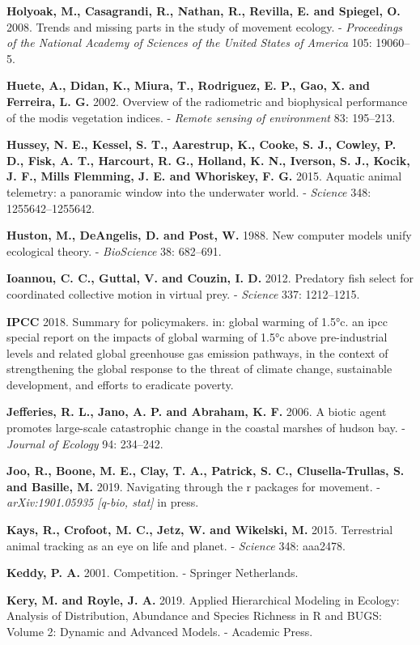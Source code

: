 \documentclass[]{scrartcl}
\begin{document}
\begin{multicols}{2}
\textbf{Holyoak, M., Casagrandi, R., Nathan, R., Revilla, E. and
Spiegel, O.} 2008. Trends and missing parts in the study of movement
ecology. - \emph{Proceedings of the National Academy of Sciences of the
United States of America} 105: 19060--5.

\textbf{Huete, A., Didan, K., Miura, T., Rodriguez, E. P., Gao, X. and
Ferreira, L. G.} 2002. Overview of the radiometric and biophysical
performance of the modis vegetation indices. - \emph{Remote sensing of
environment} 83: 195--213.

\textbf{Hussey, N. E., Kessel, S. T., Aarestrup, K., Cooke, S. J.,
Cowley, P. D., Fisk, A. T., Harcourt, R. G., Holland, K. N., Iverson, S.
J., Kocik, J. F., Mills Flemming, J. E. and Whoriskey, F. G.} 2015.
Aquatic animal telemetry: a panoramic window into the underwater world.
- \emph{Science} 348: 1255642--1255642.

\textbf{Huston, M., DeAngelis, D. and Post, W.} 1988. New computer
models unify ecological theory. - \emph{BioScience} 38: 682--691.

\textbf{Ioannou, C. C., Guttal, V. and Couzin, I. D.} 2012. Predatory
fish select for coordinated collective motion in virtual prey. -
\emph{Science} 337: 1212--1215.

\textbf{IPCC} 2018. Summary for policymakers. in: global warming of
1.5°c. an ipcc special report on the impacts of global warming of 1.5°c
above pre-industrial levels and related global greenhouse gas emission
pathways, in the context of strengthening the global response to the
threat of climate change, sustainable development, and efforts to
eradicate poverty.

\textbf{Jefferies, R. L., Jano, A. P. and Abraham, K. F.} 2006. A biotic
agent promotes large-scale catastrophic change in the coastal marshes of
hudson bay. - \emph{Journal of Ecology} 94: 234--242.

\textbf{Joo, R., Boone, M. E., Clay, T. A., Patrick, S. C.,
Clusella-Trullas, S. and Basille, M.} 2019. Navigating through the r
packages for movement. - \emph{arXiv:1901.05935 {[}q-bio, stat{]}} in
press.

\textbf{Kays, R., Crofoot, M. C., Jetz, W. and Wikelski, M.} 2015.
Terrestrial animal tracking as an eye on life and planet. -
\emph{Science} 348: aaa2478.

\textbf{Keddy, P. A.} 2001. Competition. - Springer Netherlands.

\textbf{Kery, M. and Royle, J. A.} 2019. Applied Hierarchical Modeling
in Ecology: Analysis of Distribution, Abundance and Species Richness in
R and BUGS: Volume 2: Dynamic and Advanced Models. - Academic Press.


\end{multicols}
\end{document}
